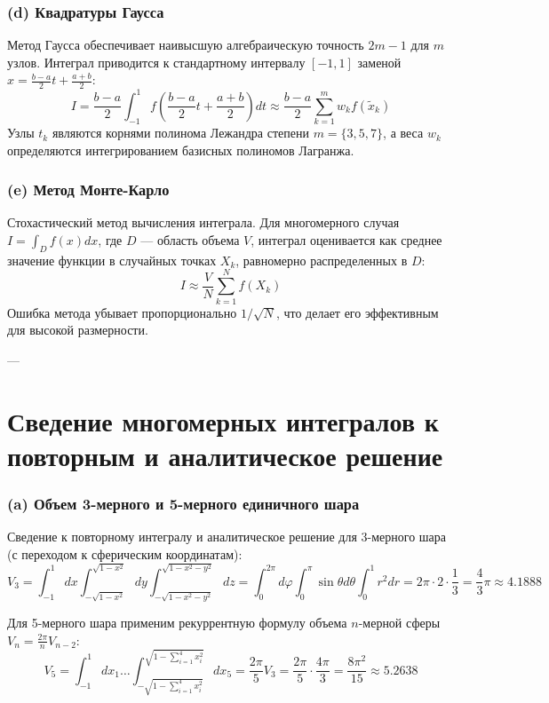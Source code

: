 \documentclass[a4paper]{article}
\begin{document}
\subsubsection*{(d) Квадратуры Гаусса}
Метод Гаусса обеспечивает наивысшую алгебраическую точность $2m-1$ для $m$ узлов.
Интеграл приводится к стандартному интервалу $[-1, 1]$ заменой $x = \frac{b-a}{2}t + \frac{a+b}{2}$:
$$I = \frac{b-a}{2} \int_{-1}^1 f\left(\frac{b-a}{2}t + \frac{a+b}{2}\right) dt \approx \frac{b-a}{2} \sum_{k=1}^m w_k f(\tilde{x}_k)$$
Узлы $t_k$ являются корнями полинома Лежандра степени $m=\{3,5,7\}$, а веса $w_k$ определяются интегрированием базисных полиномов Лагранжа.

\subsubsection*{(e) Метод Монте-Карло}
Стохастический метод вычисления интеграла. Для многомерного случая $I = \int_D f(x) dx$, где $D$ — область объема $V$, интеграл оценивается как среднее значение функции в случайных точках $X_k$, равномерно распределенных в $D$:
$$I \approx \frac{V}{N} \sum_{k=1}^N f(X_k)$$
Ошибка метода убывает пропорционально $1/\sqrt{N}$, что делает его эффективным для высокой размерности.

---

\section*{\fontsize{11pt}{0pt}\selectfont\textbf{Сведение многомерных интегралов к повторным и аналитическое решение}}

\subsubsection*{(a) Объем 3-мерного и 5-мерного единичного шара}
Сведение к повторному интегралу и аналитическое решение для 3-мерного шара (с переходом к сферическим координатам):
$$V_3 = \int_{-1}^1 dx \int_{-\sqrt{1-x^2}}^{\sqrt{1-x^2}} dy \int_{-\sqrt{1-x^2-y^2}}^{\sqrt{1-x^2-y^2}} dz = \int_0^{2\pi} d\varphi \int_0^\pi \sin\theta d\theta \int_0^1 r^2 dr = 2\pi \cdot 2 \cdot \frac{1}{3} = \frac{4}{3}\pi \approx 4.1888$$

Для 5-мерного шара применим рекуррентную формулу объема $n$-мерной сферы $V_n = \frac{2\pi}{n}V_{n-2}$:
$$V_5 = \int_{-1}^1 dx_1 \dots \int_{-\sqrt{1-\sum_{i=1}^4 x_i^2}}^{\sqrt{1-\sum_{i=1}^4 x_i^2}} dx_5 = \frac{2\pi}{5} V_3 = \frac{2\pi}{5} \cdot \frac{4\pi}{3} = \frac{8\pi^2}{15} \approx 5.2638$$
\end{document}
